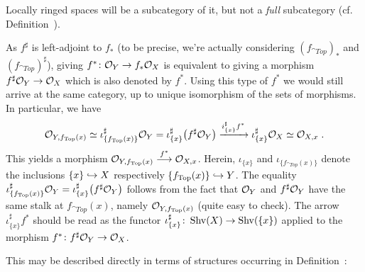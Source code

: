 \documentclass[a4paper,parskip=half,numbers=enddot, DIV=12]{scrreprt}
\begin{document}
\begin{rem*}
    Locally ringed spaces will be a subcategory of it, but not a \emph{full} subcategory (cf. Definition~).
\end{rem*}
\begin{rem*}
    As $f^\sharp$ is left-adjoint to $f_*$ (to be precise, we're actually considering  $(f_{\cat{Top}})_*$ and $(f_{\cat{Top}})^\sharp$), giving $f^*\colon \mathcal{O}_Y\to f_*\mathcal{O}_X$ is equivalent to giving a morphism $f^\sharp \mathcal{O}_Y \to \mathcal{O}_X$ which is also denoted by $f^*$. Using this type of $f^*$ we would still arrive at the same category, up to unique isomorphism of the sets of morphisms. In particular, we have 
    \begin{align*}
    	\mathcal{O}_{Y,f_{\operatorname{Top}}(x)} \simeq \iota_{\{f_{\operatorname{Top}}(x)\}}^\sharp \mathcal{O}_Y = \iota_{\{x\}}^\sharp \big(f^\sharp \mathcal{O}_Y\big)  \xrightarrow{i^\sharp_{\{x\}}f^*} \iota^\sharp_{\{x\}} \mathcal{O}_X \simeq \mathcal{O}_{X,x}\;. 
    \end{align*}
    This yields a morphism $\Oo_{Y,f_{\cat{Top}}(x)} \morphism[f^*] \Oo_{X,x}$. Herein, $\iota_{\{x\}}$ and $\iota_{\{f_{\cat{Top}}(x)\}}$ denote the inclusions $\{x\}\monomorphism X$ respectively $\{f_{\cat{Top}}(x)\}\monomorphism Y$. The equality $\iota_{\{f_{\operatorname{Top}}(x)\}}^\sharp \mathcal{O}_Y = \iota_{\{x\}}^\sharp \big(f^\sharp \mathcal{O}_Y\big)$ follows from the fact that $\mathcal{O}_Y$ and $f^\sharp\mathcal{O}_Y$ have the same stalk at $f_{\cat{Top}}(x)$, namely $\mathcal{O}_{Y,f_{\operatorname{Top}}(x)}$ (quite easy to check). The arrow $\iota_{\{x\}}^\sharp f^*$ should be read as the functor $\iota_{\{x\}}^\sharp\colon\cat{Shv}(X)\morphism\cat{Shv}(\{x\})$ applied to the morphism $f^*\colon f^\sharp\Oo_Y\morphism\Oo_X$.
    
    This may be described directly in terms of structures occurring in Definition~:
\end{rem*}
\end{document}
